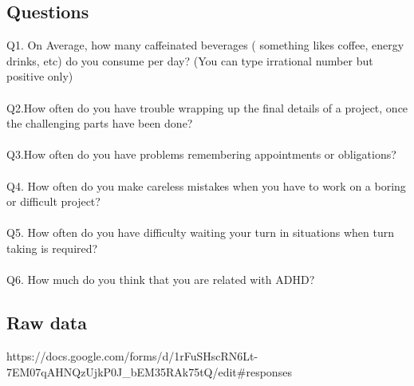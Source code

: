 \documentclass[12pt]{article}
\begin{document}
\subsection{Questions}
Q1. On Average, how many caffeinated beverages ( something likes coffee, energy drinks, etc) do you consume per day?
(You can type irrational number but positive only)
\\
\\
Q2.How often do you have trouble wrapping up the final details of a project, once the challenging parts have been done?
\\
\\Q3.How often do you have problems remembering appointments or obligations?
\\
\\
Q4.
How often do you make careless mistakes when you have to work on a boring or difficult project?
\\
\\
Q5.
How often do you have difficulty waiting your turn in situations when turn taking is required?
\\
\\
Q6.
How much do you think that you are related with ADHD?

\subsection{Raw data}
https://docs.google.com/forms/d/1rFuSHscRN6Lt-7EM07qAHNQzUjkP0J_bEM35RAk75tQ/edit#responses
\end{document}
